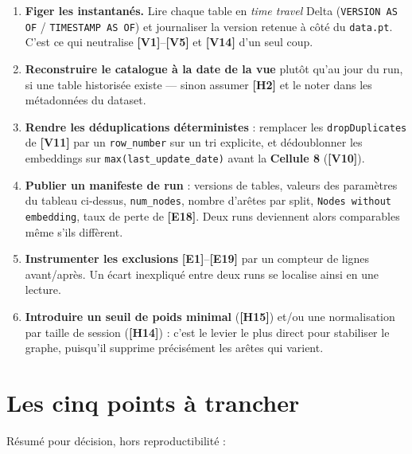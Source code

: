 \documentclass[11pt,a4paper]{article}
\newcommand{\code}[1]{\texttt{\small #1}}
\newcommand{\hyp}[1]{\textcolor{hypcol}{\textbf{\small [#1]}}}
\newcommand{\cell}[1]{\textbf{Cellule #1}}
\begin{document}
\begin{enumerate}[leftmargin=*]
  \item \textbf{Figer les instantanés.} Lire chaque table en \emph{time travel} Delta
        (\code{VERSION AS OF} / \code{TIMESTAMP AS OF}) et journaliser la version
        retenue à côté du \code{data.pt}. C'est ce qui neutralise
        \hyp{V1}--\hyp{V5} et \hyp{V14} d'un seul coup.
  \item \textbf{Reconstruire le catalogue à la date de la vue} plutôt qu'au jour du
        run, si une table historisée existe --- sinon assumer \hyp{H2} et le noter
        dans les métadonnées du dataset.
  \item \textbf{Rendre les déduplications déterministes} : remplacer les
        \code{dropDuplicates} de \hyp{V11} par un \code{row\_number} sur un tri
        explicite, et dédoublonner les embeddings sur
        \code{max(last\_update\_date)} avant la \cell{8} (\hyp{V10}).
  \item \textbf{Publier un manifeste de run} : versions de tables, valeurs des
        paramètres du tableau ci-dessus, \code{num\_nodes}, nombre d'arêtes par
        split, \code{Nodes without embedding}, taux de perte de \hyp{E18}. Deux runs
        deviennent alors comparables même s'ils diffèrent.
  \item \textbf{Instrumenter les exclusions} \hyp{E1}--\hyp{E19} par un compteur de
        lignes avant/après. Un écart inexpliqué entre deux runs se localise ainsi en
        une lecture.
  \item \textbf{Introduire un seuil de poids minimal} (\hyp{H15}) et/ou une
        normalisation par taille de session (\hyp{H14}) : c'est le levier le plus
        direct pour stabiliser le graphe, puisqu'il supprime précisément les arêtes
        qui varient.
\end{enumerate}

\section{Les cinq points à trancher}

Résumé pour décision, hors reproductibilité :
\end{document}
